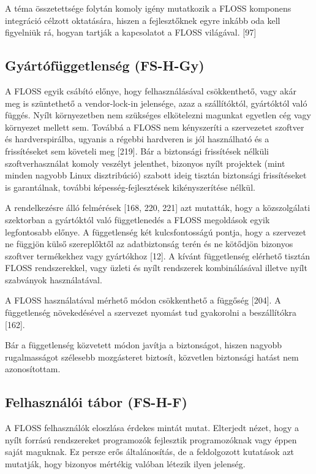 \documentclass[12pt,magyar,a4paper,oneside]{scrreprt}
\begin{document}
A téma összetettsége folytán komoly igény mutatkozik a FLOSS komponens
integráció célzott oktatására, hiszen a fejlesztőknek egyre inkább oda
kell figyelniük rá, hogyan tartják a kapcsolatot a FLOSS világával.
{[}97{]}

\hypertarget{sec:FS-H-Gy}{%
\subsection{Gyártófüggetlenség (FS-H-Gy)}\label{sec:FS-H-Gy}}

A FLOSS egyik csábító előnye, hogy felhasználásával csökkenthető, vagy
akár meg is szüntethető a vendor-lock-in jelensége, azaz a szállítóktól,
gyártóktól való függés. Nyílt környezetben nem szükséges elkötelezni
magunkat egyetlen cég vagy környezet mellett sem. Továbbá a FLOSS nem
kényszeríti a szervezetet szoftver és hardverspirálba, ugyanis a régebbi
hardveren is jól használható és a frissítéseket sem követeli meg
{[}219{]}. Bár a biztonsági frissítések nélküli szoftverhasználat komoly
veszélyt jelenthet, bizonyos nyílt projektek (mint minden nagyobb Linux
disztribúció) szabott ideig tisztán biztonsági frissítéseket is
garantálnak, további képesség-fejlesztések kikényszerítése nélkül.

A rendelkezésre álló felmérések {[}168, 220, 221{]} azt mutatták, hogy a
közszolgálati szektorban a gyártóktól való függetlenedés a FLOSS
megoldások egyik legfontosabb előnye. A függetlenség két kulcsfontosságú
pontja, hogy a szervezet ne függjön külső szereplőktől az adatbiztonság
terén és ne kötődjön bizonyos szoftver termékekhez vagy gyártókhoz
{[}12{]}. A kívánt függetlenség elérhető tisztán FLOSS rendszerekkel,
vagy üzleti és nyílt rendszerek kombinálásával illetve nyílt szabványok
használatával.

A FLOSS használatával mérhető módon csökkenthető a függőség {[}204{]}. A
függetlenség növekedésével a szervezet nyomást tud gyakorolni a
beszállítókra {[}162{]}.

Bár a függetlenség közvetett módon javítja a biztonságot, hiszen nagyobb
rugalmasságot szélesebb mozgásteret biztosít, közvetlen biztonsági
hatást nem azonosítottam.

\hypertarget{sec:FS-H-F}{%
\subsection{Felhasználói tábor (FS-H-F)}\label{sec:FS-H-F}}

A FLOSS felhasználók eloszlása érdekes mintát mutat. Elterjedt nézet,
hogy a nyílt forrású rendszereket programozók fejlesztik programozóknak
vagy éppen saját maguknak. Ez persze erős általánosítás, de a
feldolgozott kutatások azt mutatják, hogy bizonyos mértékig valóban
létezik ilyen jelenség.
\end{document}
